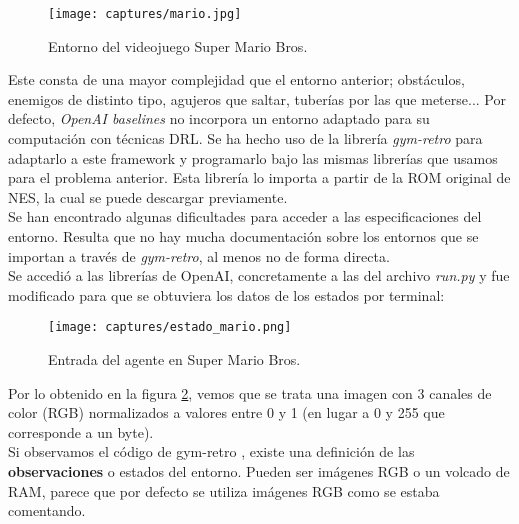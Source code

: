 \documentclass[11pt,fleqn]{book} %
\begin{document}
\begin{figure}[H]
	\centering\texttt{[image: captures/mario.jpg]}
	\caption{Entorno del videojuego Super Mario Bros.}
	\label{fig:mario} %
\end{figure}

Este consta de una mayor complejidad que el entorno anterior; obstáculos, enemigos de distinto tipo, agujeros que saltar, tuberías por las que meterse... Por defecto, \textit{OpenAI baselines} no incorpora un entorno adaptado para su computación con técnicas DRL. Se ha hecho uso de la librería \textit{gym-retro}\cite{article:gymretro} para adaptarlo a este framework y programarlo bajo las mismas librerías que usamos para el problema anterior. Esta librería lo importa a partir de la ROM original de NES, la cual se puede descargar previamente. \\

Se han encontrado algunas dificultades para acceder a las especificaciones del entorno. Resulta que no hay mucha documentación sobre los entornos que se importan a través de \textit{gym-retro}, al menos no de forma directa. \\

Se accedió a las librerías de OpenAI, concretamente a las del archivo \textit{run.py} y fue modificado para que se obtuviera los datos de los estados por terminal:

\begin{figure}[H]
	\centering\texttt{[image: captures/estado\_mario.png]}
	\caption{Entrada del agente en Super Mario Bros.}
	\label{fig:entradamario} %
\end{figure}

Por lo obtenido en la figura \ref{fig:entradamario}, vemos que se trata una imagen con 3 canales de color (RGB) normalizados a valores entre 0 y 1 (en lugar a 0 y 255 que corresponde a un byte). \\

Si observamos el código de gym-retro \cite{article:retroobservations}, existe una definición de las \textbf{observaciones} o estados del entorno. Pueden ser imágenes RGB o un volcado de RAM, parece que por defecto se utiliza imágenes RGB como se estaba comentando. \\
\end{document}
